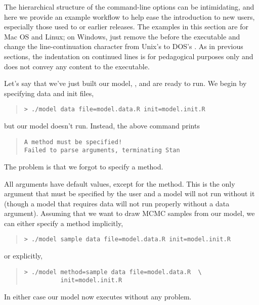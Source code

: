 The hierarchical structure of the command-line options can be
intimidating, and here we provide an example workflow to help ease the
introduction to new users, especially those used to  or
earlier releases.  The examples in this section are for Mac OS and
Linux; on Windows, just remove the  before the executable and
change the line-continuation character from Unix's
\code{\textbackslash} to DOS's \code{\textasciicircum}.  As in
previous sections, the indentation on continued lines is for
pedagogical purposes only and does not convey any content to the
executable.

Let's say that we've just built our model, , and are ready to run.
We begin by specifying data and init files,
%
\begin{quote}
\begin{Verbatim}[fontshape=sl]
> ./model data file=model.data.R init=model.init.R
\end{Verbatim}
\end{quote}
%
but our model doesn't run.  Instead, the above command prints
%
\begin{quote}
\begin{Verbatim}
A method must be specified!
Failed to parse arguments, terminating Stan
\end{Verbatim}
\end{quote}
%
The problem is that we forgot to specify a method.

All \Stan arguments have default values, except for the method.  This
is the only argument that must be specified by the user and a model
will not run without it (though a model that requires data will not
run properly without a data argument).  Assuming that we want to draw
MCMC samples from our model, we can either specify a method
implicitly,
%
\begin{quote}
\begin{Verbatim}[fontshape=sl]
> ./model sample data file=model.data.R init=model.init.R
\end{Verbatim}
\end{quote}
%
or explicitly,
%
\begin{quote}
\begin{Verbatim}[fontshape=sl]
> ./model method=sample data file=model.data.R  \
          init=model.init.R
\end{Verbatim}
\end{quote}
%
In either case our model now executes without any problem.


